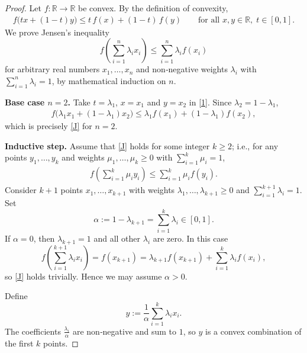 \begin{proof}
Let $f:\mathbb R\to\mathbb R$ be convex. By the definition of convexity,
\begin{align}
f\bigl(t x+(1-t)y\bigr)\le t\,f(x)+(1-t)\,f(y)\qquad\text{for all }x,y\in\mathbb R,\;t\in[0,1].
\tag{1}
\end{align}
We prove Jensen’s inequality
\[
f\!\left(\sum_{i=1}^{n}\lambda_i x_i\right)\le \sum_{i=1}^{n}\lambda_i f(x_i)
\tag{J}
\]
for arbitrary real numbers $x_1,\dots ,x_n$ and non‑negative weights $\lambda_i$ with $\sum_{i=1}^{n}\lambda_i=1$, by mathematical induction on $n$.

\medskip
\noindent\textbf{Base case $n=2$.}  
Take $t=\lambda_1$, $x=x_1$ and $y=x_2$ in \eqref{1}. Since $\lambda_2=1-\lambda_1$,
\begin{align*}
f\bigl(\lambda_1 x_1+(1-\lambda_1)x_2\bigr)
   \le \lambda_1 f(x_1)+(1-\lambda_1)f(x_2),
\end{align*}
which is precisely \eqref{J} for $n=2$.

\medskip
\noindent\textbf{Inductive step.}  
Assume that \eqref{J} holds for some integer $k\ge 2$; i.e., for any points $y_1,\dots ,y_k$ and weights $\mu_1,\dots ,\mu_k\ge0$ with $\sum_{i=1}^{k}\mu_i=1$,
\begin{align}
f\!\left(\sum_{i=1}^{k}\mu_i y_i\right)\le \sum_{i=1}^{k}\mu_i f(y_i).
\tag{IH}
\end{align}
Consider $k+1$ points $x_1,\dots ,x_{k+1}$ with weights $\lambda_1,\dots ,\lambda_{k+1}\ge0$ and $\sum_{i=1}^{k+1}\lambda_i=1$.
Set
\[
\alpha:=1-\lambda_{k+1}=\sum_{i=1}^{k}\lambda_i\in[0,1].
\]
If $\alpha=0$, then $\lambda_{k+1}=1$ and all other $\lambda_i$ are zero. In this case
\[
f\!\left(\sum_{i=1}^{k+1}\lambda_i x_i\right)=f(x_{k+1})
      =\lambda_{k+1}f(x_{k+1})+\sum_{i=1}^{k}\lambda_i f(x_i),
\]
so \eqref{J} holds trivially. Hence we may assume $\alpha>0$.

Define
\[
y:=\frac{1}{\alpha}\sum_{i=1}^{k}\lambda_i x_i .
\]
The coefficients $\frac{\lambda_i}{\alpha}$ are non‑negative and sum to $1$, so $y$ is a convex combination of the first $k$ points.


\end{proof}

